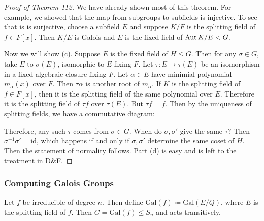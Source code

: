 \documentclass[10pt, twoside]{article}
\newcommand{\Gal}[1]{\mathrm{Gal}(#1)}
\begin{document}
    \begin{proof}[Proof of Theorem 112] We have already shown most of this
        theorem. For example, we showed that the map from subgroups to
        subfields is injective. To see that is is surjective, choose a subfield
        $E$ and suppose $K/F$ is the splitting field of $f \in F[x]$. Then
        $K/E$ is Galois and $E$ is the fixed field of $\operatorname{Aut}{K/E} < G$.

        Now we will show (c). Suppose $E$ is the fixed field of $H \leq G$.
        Then for any $\sigma \in G$, take $E$ to $\sigma(E)$, isomorphic to $E$
        fixing $F$. Let $\tau: E \to \tau(E)$ be an isomorphism in a fixed
        algebraic closure fixing $F$. Let $\alpha \in E$ have minimial
        polynomial $m_{\alpha}(x)$ over $F$. Then $\tau \alpha$ is another root
        of $m_{\alpha}$. If $K$ is the splitting field of $f \in F[x]$, then it
        is the splitting field of the same polynomial over $E$. Therefore it is
        the splitting field of $\tau f$ over $\tau(E)$. But $\tau f = f$. Then
        by the uniqueness of splitting fields, we have a commutative diagram:
        \begin{center} 
        \end{center} Therefore, any such $\tau$ comes from $\sigma \in G$. When
        do $\sigma, \sigma'$ give the same $\tau$? Then $\sigma^{-1}\sigma' =
        \mathrm{id}$, which happens if and only if $\sigma, \sigma'$ determine
        the same coset of $H$. Then the statement of normality follows. Part
        (d) is easy and is left to the treatment in D\&F.  \end{proof}

        \subsubsection{Computing Galois Groups}%
        \begin{prop} Let $f$ be irreducible of degree $n$. Then define $\Gal{f}
            \coloneqq \Gal{E/Q}$, where $E$ is the splitting field of $f$. Then
            $G = \Gal{f} \leq S_n$ and acts transitively.  \end{prop}
\end{document}
